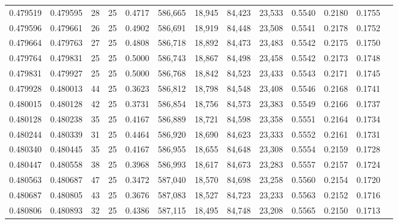 \begin{tabular}{rrrrrrrrrrrrr}
0.479519 & 0.479595 &    28 &  25 &                                     0.4717 & 586,665 &  18,945 &  84,423 &  23,533 & 0.5540 & 0.2180 & 0.1755 \\
0.479596 & 0.479661 &    26 &  25 &                                     0.4902 & 586,691 &  18,919 &  84,448 &  23,508 & 0.5541 & 0.2178 & 0.1752 \\
0.479664 & 0.479763 &    27 &  25 &                                     0.4808 & 586,718 &  18,892 &  84,473 &  23,483 & 0.5542 & 0.2175 & 0.1750 \\
0.479764 & 0.479831 &    25 &  25 &                                     0.5000 & 586,743 &  18,867 &  84,498 &  23,458 & 0.5542 & 0.2173 & 0.1748 \\
0.479831 & 0.479927 &    25 &  25 &                                     0.5000 & 586,768 &  18,842 &  84,523 &  23,433 & 0.5543 & 0.2171 & 0.1745 \\
0.479928 & 0.480013 &    44 &  25 &                                     0.3623 & 586,812 &  18,798 &  84,548 &  23,408 & 0.5546 & 0.2168 & 0.1741 \\
0.480015 & 0.480128 &    42 &  25 &                                     0.3731 & 586,854 &  18,756 &  84,573 &  23,383 & 0.5549 & 0.2166 & 0.1737 \\
0.480128 & 0.480238 &    35 &  25 &                                     0.4167 & 586,889 &  18,721 &  84,598 &  23,358 & 0.5551 & 0.2164 & 0.1734 \\
0.480244 & 0.480339 &    31 &  25 &                                     0.4464 & 586,920 &  18,690 &  84,623 &  23,333 & 0.5552 & 0.2161 & 0.1731 \\
0.480340 & 0.480445 &    35 &  25 &                                     0.4167 & 586,955 &  18,655 &  84,648 &  23,308 & 0.5554 & 0.2159 & 0.1728 \\
0.480447 & 0.480558 &    38 &  25 &                                     0.3968 & 586,993 &  18,617 &  84,673 &  23,283 & 0.5557 & 0.2157 & 0.1724 \\
0.480563 & 0.480687 &    47 &  25 &                                     0.3472 & 587,040 &  18,570 &  84,698 &  23,258 & 0.5560 & 0.2154 & 0.1720 \\
0.480687 & 0.480805 &    43 &  25 &                                     0.3676 & 587,083 &  18,527 &  84,723 &  23,233 & 0.5563 & 0.2152 & 0.1716 \\
0.480806 & 0.480893 &    32 &  25 &                                     0.4386 & 587,115 &  18,495 &  84,748 &  23,208 & 0.5565 & 0.2150 & 0.1713 \\

\end{tabular}
